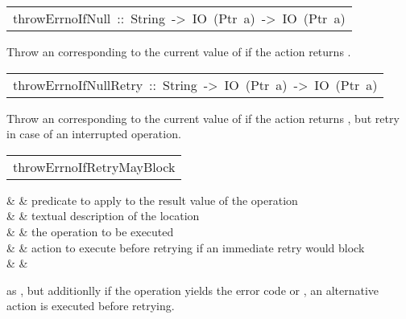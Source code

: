 \begin{haddockdesc}
\item[\begin{tabular}{@{}l}
throwErrnoIfNull\ ::\ String\ ->\ IO\ (Ptr\ a)\ ->\ IO\ (Ptr\ a)
\end{tabular}]\haddockbegindoc
Throw an  corresponding to the current value of 
 if the  action returns .
\par

\end{haddockdesc}
\begin{haddockdesc}
\item[\begin{tabular}{@{}l}
throwErrnoIfNullRetry\ ::\ String\ ->\ IO\ (Ptr\ a)\ ->\ IO\ (Ptr\ a)
\end{tabular}]\haddockbegindoc
Throw an  corresponding to the current value of 
 if the  action returns ,
 but retry in case of an interrupted operation.
\par

\end{haddockdesc}
\begin{haddockdesc}
\item[\begin{tabular}{@{}l}
throwErrnoIfRetryMayBlock
\end{tabular}]\haddockbegindoc
\haddockbeginargs
\haddockdecltt{::} &  & predicate to apply to the result value
 of the  operation
 \\
                                                 \haddockdecltt{->} &  & textual description of the location
 \\
                                                                                               \haddockdecltt{->} &  & the  operation to be executed
 \\
                                                                                                                                           \haddockdecltt{->} &  & action to execute before retrying if
 an immediate retry would block
 \\
                                                                                                                                                                                       \haddockdecltt{->} &  & \\
\haddockendargs\par
as , but additionlly if the operation 
 yields the error code  or , an alternative
 action is executed before retrying.
\par

\end{haddockdesc}
